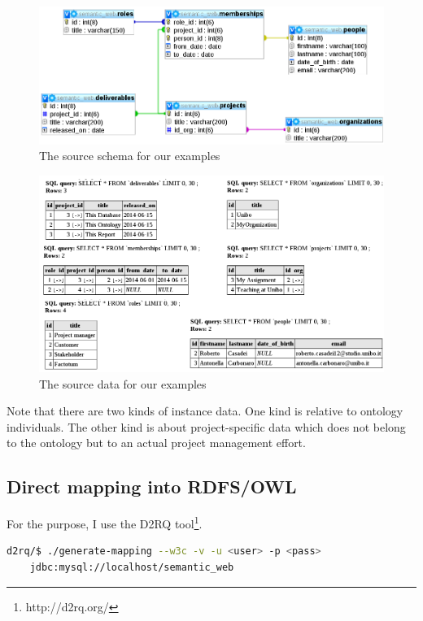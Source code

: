\documentclass[11pt]{llncs}
\begin{document}
 \begin{figure}[H]
 \centering
 \includegraphics[scale = 0.55]{img/relationalSchema.png}
 \caption{The source schema for our examples}
 \label{fig:relationalSchema}
\end{figure} 

 \begin{figure}[H]
 \centering
 \includegraphics[scale = 0.4]{img/relationalData.png}
 \caption{The source data for our examples}
 \label{fig:relationalData}
\end{figure} 

 Note that there are two kinds of instance data. One kind is relative to ontology individuals. The other kind is 
  about project-specific data which does not belong to the ontology but to an actual project management effort.

\subsection{Direct mapping into RDFS/OWL}

For the purpose, I use the D2RQ tool\footnote{http://d2rq.org/}.

\begin{lstlisting}[language=bash]
  d2rq/$ ./generate-mapping --w3c -v -u <user> -p <pass> 
	jdbc:mysql://localhost/semantic_web
\end{lstlisting}
\end{document}
